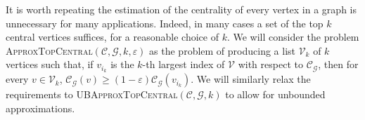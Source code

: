 \documentclass[10]{report}
\newcommand{\algoname}[1]{\textnormal{\textsc{#1}}}
\begin{document}
It is worth repeating the estimation of the centrality of every vertex in a graph is unnecessary for many applications.
Indeed, in many cases a set of the top $k$ central vertices suffices, for a reasonable choice of $k$. 
We will consider the problem \algoname{ApproxTopCentral}$(\mathcal{C}, \mathcal{G}, k, \varepsilon)$ as the problem of producing a list $\mathcal{V}_k$ of $k$ vertices such that, if $v_{i_k}$ is the $k$-th largest index of $\mathcal{V}$ with respect to $\mathcal{C}_\mathcal{G}$, then for every $v \in \mathcal{V}_k$, $\mathcal{C}_\mathcal{G}(v) \geq (1-\varepsilon)\mathcal{C}_\mathcal{G}(v_{i_k})$. 
We will similarly relax the requirements to \algoname{UBApproxTopCentral}$(\mathcal{C}, \mathcal{G}, k)$ to allow for unbounded approximations. 
\end{document}
